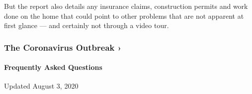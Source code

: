 But the report also details any insurance claims, construction permits
and work done on the home that could point to other problems that are
not apparent at first glance --- and certainly not through a video tour.

\href{https://www.nytimes3xbfgragh.onion/news-event/coronavirus?action=click\&pgtype=Article\&state=default\&region=MAIN_CONTENT_3\&context=storylines_faq}{}

\hypertarget{the-coronavirus-outbreak-}{%
\subsubsection{The Coronavirus Outbreak
›}\label{the-coronavirus-outbreak-}}

\hypertarget{frequently-asked-questions}{%
\paragraph{Frequently Asked
Questions}\label{frequently-asked-questions}}

Updated August 3, 2020

